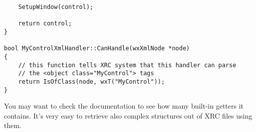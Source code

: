 \begin{verbatim}
    SetupWindow(control);

    return control;
}

bool MyControlXmlHandler::CanHandle(wxXmlNode *node)
{
    // this function tells XRC system that this handler can parse
    // the <object class="MyControl"> tags
    return IsOfClass(node, wxT("MyControl"));
}
\end{verbatim}

You may want to check the  documentation
to see how many built-in getters it contains. It's very easy to retrieve also complex structures
out of XRC files using them.

